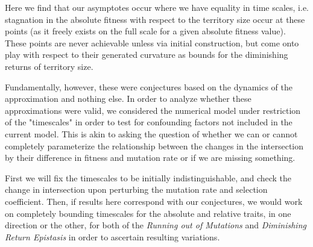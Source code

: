 \documentclass[9pt,twocolumn,twoside]{article}
\begin{document}
Here we find that our asymptotes occur where we have equality in time scales, i.e. stagnation in the absolute fitness with respect to the territory size occur at these points (as it freely exists on the full scale for a given absolute fitness value). These points are never achievable unless via initial construction, but come onto play with respect to their generated curvature as bounds for the diminishing returns of territory size.

Fundamentally, however, these were conjectures based on the dynamics of the approximation and nothing else. In order to analyze whether these approximations were valid, we considered the numerical model under restriction of the "timescales" in order to test for confounding factors not included in the current model. This is akin to asking the question of whether we can or cannot completely parameterize the relationship between the changes in the intersection by their difference in fitness and mutation rate or if we are missing something. 

First we will fix the timescales to be initially indistinguishable, and check the change in intersection upon perturbing the mutation rate and selection coefficient. Then, if results here correspond with our conjectures, we would work on completely bounding timescales for the absolute and relative traits, in one direction or the other, for both of the \textit{Running out of Mutations} and \textit{Diminishing Return Epistasis} in order to ascertain resulting variations.

\end{document}
